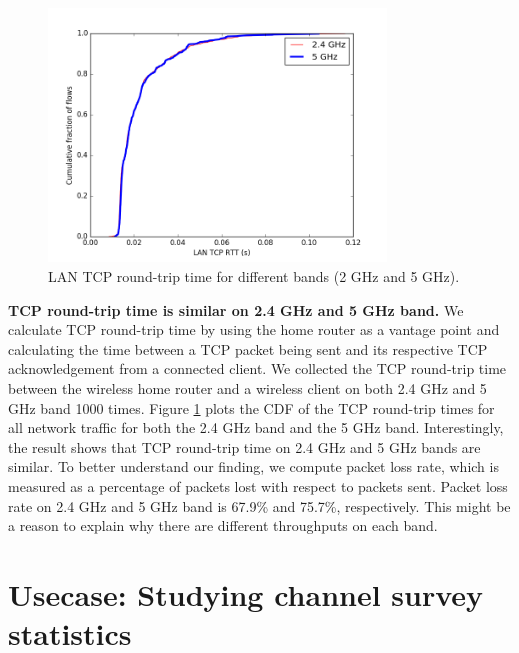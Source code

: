 \begin{figure}
\centering
\includegraphics[width=0.8\textwidth]{figure/tcp_rtt.png}
\caption{LAN TCP round-trip time for different bands (2 GHz and 5 GHz).} 
\label{fig:tcprtt}
\end{figure}

\textbf{TCP round-trip time is similar on 2.4 GHz and 5 GHz band.} We calculate TCP round-trip time by using the home router as a vantage point and calculating the time between a TCP packet being sent and its respective TCP acknowledgement from a connected client. We collected the TCP round-trip time between the wireless home router and a wireless client on both 2.4 GHz and 5 GHz band 1000 times. Figure \ref{fig:tcprtt} plots the CDF of the TCP round-trip times for all network traffic for both the 2.4 GHz band and the 5 GHz band. Interestingly, the result shows that TCP round-trip time on 2.4 GHz and 5 GHz bands are similar. To better understand our finding, we compute packet loss rate, which is measured as a percentage of packets lost with respect to packets sent. Packet loss rate on 2.4 GHz and 5 GHz band is 67.9\% and 75.7\%, respectively. This might be a reason to explain why there are different throughputs on each band.  

\section{Usecase: Studying channel survey statistics}
\label{sec.usecase2}

